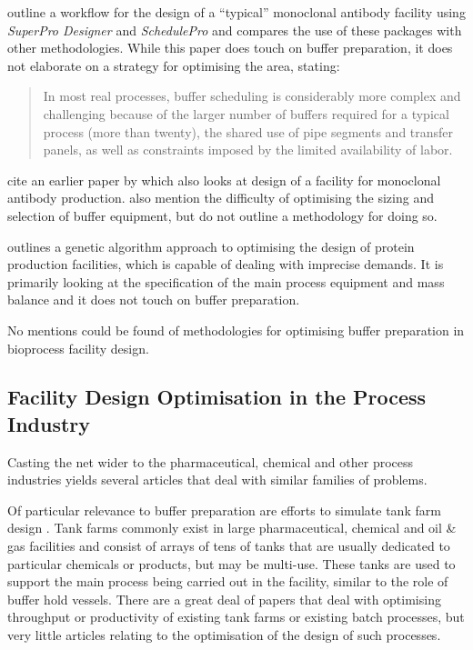 \citet{Petrides:2014} outline a workflow for 
the design of a ``typical'' monoclonal antibody facility using 
\emph{SuperPro Designer\textsuperscript{\textregistered}} and
\emph{SchedulePro\textsuperscript{\textregistered}} and compares the use of
these packages with other methodologies.
While this paper does touch on buffer preparation,
it does not elaborate on a strategy for optimising the area, stating:
\begin{quote}In most real processes, buffer scheduling is considerably more
complex and challenging because of the larger number of buffers required for a
typical process (more than twenty), the shared use of pipe segments and transfer
panels, as well as constraints imposed by the limited availability of labor.
\end{quote}
\citet{Petrides:2014} cite an earlier paper by \citet{Toumi:2010} which also
looks at design of a facility for monoclonal antibody production.
\citet{Toumi:2010} also mention the difficulty of optimising the sizing and 
selection of buffer equipment, but do not outline a methodology for doing so.

\citet{Dietz:2008} outlines a genetic algorithm approach to optimising the 
design of protein production facilities, which is capable of dealing with
imprecise demands.  It is primarily looking at the specification of the main
process equipment and mass balance and it does not touch on buffer preparation.

No mentions could be found of methodologies for optimising buffer preparation in
bioprocess facility design.

\subsection{Facility Design Optimisation in the Process Industry}
\label{SS.fdopi}
Casting the net wider to the pharmaceutical, chemical and other process
industries yields several articles that deal with similar families of problems.

Of particular relevance to buffer preparation are efforts to simulate tank farm
design \citep{Al-Otaibi:2004, Stewart:2005, Sharda:2009, Terrazas-Moreno:2012}.
Tank farms commonly exist in large pharmaceutical, chemical and oil \&
gas facilities and consist of arrays of tens of tanks that are usually dedicated
to particular chemicals or products, but may be multi-use.  These tanks are used
to support the main process being carried out in the facility, similar to the
role of buffer hold vessels.  There are a great deal of papers that deal with
optimising throughput or productivity of existing tank farms or existing batch
processes, but very little articles relating to the optimisation of the design
of such processes.

